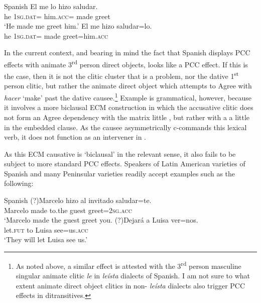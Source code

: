 \documentclass[output=paper,colorlinks,citecolor=brown,nonflat]{./langscibook}
\begin{document}
\ea%
    \label{ex:sheehan:33}
    Spanish \citep[463]{Torrego2010}
    \ea\label{ex:sheehan:33a}
    \gll    *El   me     lo     hizo   saludar.\\
            he   \textsc{1sg}.\textsc{dat}=  him.\textsc{acc}=  made greet\\
    \glt    ‘He made me greet him.’ 
    \ex\label{ex:sheehan:33b}
    \gll    El   me     hizo   saludar=lo.\\
            he   \textsc{1sg}.\textsc{dat=}  made   greet=him.\textsc{acc}\\
    \z
\z

In the current context, and bearing in mind the fact that Spanish displays PCC effects with animate 3\textsuperscript{rd} person direct objects,  looks like a PCC effect. If this is the case, then it is not the clitic cluster that is a problem, nor the dative 1\textsuperscript{st} person clitic, but rather the animate direct object which attempts to Agree with \textit{hacer} ‘make’ past the dative causee.\footnote{As noted above, a similar effect is attested with the 3\textsuperscript{rd} person masculine singular animate clitic \textit{le} in \textit{leísta} dialects of Spanish. I am not sure to what extent animate direct object clitics in non- \textit{leísta} dialects also trigger PCC effects in ditransitives.  } Example  is grammatical, however, because it involves a more biclausal ECM construction in which the accusative clitic does not form an Agree dependency with the matrix little \liv , but rather with a a little \liv in the embedded clause. As the causee asymmetrically c-commands this lexical verb, it does not function as an intervener in . 

As this ECM causative is ‘biclausal’ in the relevant sense, it also fails to be subject to more standard PCC effects. Speakers of Latin American varieties of Spanish and many Peninsular varieties readily accept examples such as the following:

\ea%
    \label{ex:sheehan:34}
    Spanish
    \ea\label{ex:sheehan:34a}
    \gll    (?)Marcelo   hizo   al   invitado  saludar=te.\\
            Marcelo   made  to.the guest greet=\textsc{2sg}.\textsc{acc}\\
    \glt    `Marcelo made the guest greet you. 
    \ex\label{ex:sheehan:34b}
    \gll    (?)Dejará   a   Luisa   ver=nos.\\
            let.\textsc{fut}   to   Luisa   see=us.\textsc{acc}\\
    \glt    ‘They will let Luisa see us.’ 
    \z
\z
\end{document}
